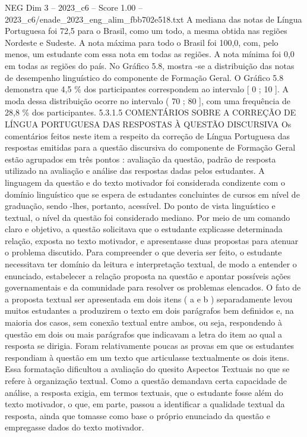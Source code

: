 \begin{textsample}{NEG Dim 3 – 2023\_c6 – Score 1.00 – 2023\_c6/enade\_2023\_eng\_alim\_fbb702e518.txt}
A mediana das notas de Língua Portuguesa foi 72,5 para o Brasil, como um todo, a mesma obtida nas regiões Nordeste e Sudeste.
A nota máxima para todo o Brasil foi 100,0, com, pelo menos, um estudante com essa nota em todas as regiões.
A nota mínima foi 0,0 em todas as regiões do país.
No Gráfico 5.8, mostra -se a distribuição das notas de desempenho linguístico do componente de Formação Geral.
O Gráfico 5.8 demonstra que 4,5 \% dos participantes correspondem ao intervalo [ 0 ; 10 ].
A moda dessa distribuição ocorre no intervalo ( 70 ; 80 ], com uma frequência de 28,8 \% dos participantes. 5.3.1.5 COMENTÁRIOS SOBRE A CORREÇÃO DE LÍNGUA PORTUGUESA DAS RESPOSTAS À QUESTÃO DISCURSIVA Os comentários feitos neste item a respeito da correção de Língua Portuguesa das respostas emitidas para a questão discursiva do componente de Formação Geral estão agrupados em três pontos : avaliação da questão, padrão de resposta utilizado na avaliação e análise das respostas dadas pelos estudantes.
A linguagem da questão e do texto motivador foi considerada condizente com o domínio linguístico que se espera de estudantes concluintes de cursos em nível de graduação, sendo -lhes, portanto, acessível.
Do ponto de vista linguístico e textual, o nível da questão foi considerado mediano.
Por meio de um comando claro e objetivo, a questão solicitava que o estudante explicasse determinada relação, exposta no texto motivador, e apresentasse duas propostas para atenuar o problema discutido.
Para compreender o que deveria ser feito, o estudante necessitava ter domínio da leitura e interpretação textual, de modo a entender o enunciado, estabelecer a relação proposta na questão e apontar possíveis ações governamentais e da comunidade para resolver os problemas elencados.
O fato de a proposta textual ser apresentada em dois itens ( a e b ) separadamente levou muitos estudantes a produzirem o texto em dois parágrafos bem definidos e, na maioria dos casos, sem conexão textual entre ambos, ou seja, respondendo à questão em dois ou mais parágrafos que indicavam a letra do item ao qual a resposta se dirigia.
Foram relativamente poucas as provas em que os estudantes respondiam à questão em um texto que articulasse textualmente os dois itens.
Essa formatação dificultou a avaliação do quesito Aspectos Textuais no que se refere à organização textual.
Como a questão demandava certa capacidade de análise, a resposta exigia, em termos textuais, que o estudante fosse além do texto motivador, o que, em parte, passou a identificar a qualidade textual da resposta, ainda que tomasse como base o próprio enunciado da questão e empregasse dados do texto motivador.

\end{textsample}
